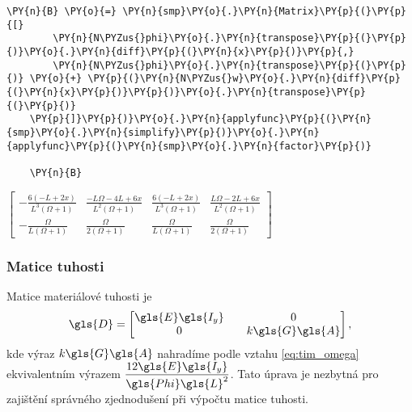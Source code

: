 \begin{tcolorbox}[breakable, size=fbox, boxrule=1pt, pad at break*=1mm,colback=cellbackground, colframe=cellborder]
    \begin{Verbatim}[commandchars=\\\{\}]
    \PY{n}{B} \PY{o}{=} \PY{n}{smp}\PY{o}{.}\PY{n}{Matrix}\PY{p}{(}\PY{p}{[}
        \PY{n}{N\PYZus{}phi}\PY{o}{.}\PY{n}{transpose}\PY{p}{(}\PY{p}{)}\PY{o}{.}\PY{n}{diff}\PY{p}{(}\PY{n}{x}\PY{p}{)}\PY{p}{,}
        \PY{n}{N\PYZus{}phi}\PY{o}{.}\PY{n}{transpose}\PY{p}{(}\PY{p}{)} \PY{o}{+} \PY{p}{(}\PY{n}{N\PYZus{}w}\PY{o}{.}\PY{n}{diff}\PY{p}{(}\PY{n}{x}\PY{p}{)}\PY{p}{)}\PY{o}{.}\PY{n}{transpose}\PY{p}{(}\PY{p}{)}
    \PY{p}{]}\PY{p}{)}\PY{o}{.}\PY{n}{applyfunc}\PY{p}{(}\PY{n}{smp}\PY{o}{.}\PY{n}{simplify}\PY{p}{)}\PY{o}{.}\PY{n}{applyfunc}\PY{p}{(}\PY{n}{smp}\PY{o}{.}\PY{n}{factor}\PY{p}{)}
    
    \PY{n}{B}
    \end{Verbatim}
\end{tcolorbox}
     
                
    
    $\displaystyle \left[\begin{matrix}- \frac{6 \left(- L + 2 x\right)}{L^{3} \left(\Omega + 1\right)} & \frac{- L \Omega - 4 L + 6 x}{L^{2} \left(\Omega + 1\right)} & \frac{6 \left(- L + 2 x\right)}{L^{3} \left(\Omega + 1\right)} & \frac{L \Omega - 2 L + 6 x}{L^{2} \left(\Omega + 1\right)}\\- \frac{\Omega}{L \left(\Omega + 1\right)} & \frac{\Omega}{2 \left(\Omega + 1\right)} & \frac{\Omega}{L \left(\Omega + 1\right)} & \frac{\Omega}{2 \left(\Omega + 1\right)}\end{matrix}\right]$
    
\subsubsection*{Matice tuhosti}
Matice materiálové tuhosti je
\begin{equation}
    \gls{D} = \begin{bmatrix}
        \gls{E}\gls{I_y} && 0 \\
        0 && k\gls{G}\gls{A}
    \end{bmatrix},
\end{equation}
kde výraz $k\gls{G}\gls{A}$ nahradíme podle vztahu \ref{eq:tim_omega} ekvivalentním výrazem $\dfrac{12\gls{E}\gls{I_y}}{\gls{Phi}\gls{L}^2}$. Tato úprava je nezbytná pro zajištění správného zjednodušení při výpočtu matice tuhosti.
    
